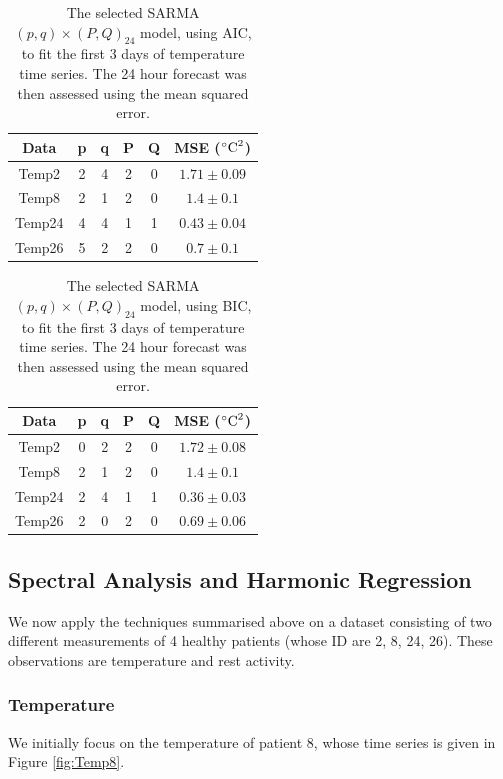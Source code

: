 \documentclass[]{article}
\begin{document}
\begin{table}[htbp]
\begin{center}
\begin{tabular}{ cccccc } 
 Data & p & q & P & Q & MSE ($^{\circ}\textup{C}^2$)\\
  \hline
 Temp2 & 2 & 4 & 2 & 0 & $1.71\pm0.09$\\
 Temp8 & 2 & 1 & 2 & 0 & $1.4\pm0.1$\\
 Temp24& 4 & 4 & 1 & 1 & $0.43\pm0.04$\\
 Temp26& 5 & 2 & 2 & 0 & $0.7\pm0.1$\\
\end{tabular}
\end{center}
\caption{The selected SARMA$(p,q)\times(P,Q)_{24}$ model, using AIC, to fit the first 3 days of temperature time series. The 24 hour forecast was then assessed using the mean squared error.}
\label{table:temp_AIC}
\end{table}

\begin{table}[htbp]
\begin{center}
\begin{tabular}{ cccccc } 
 Data & p & q & P & Q & MSE ($^{\circ}\textup{C}^2$)\\
  \hline
 Temp2 & 0 & 2 & 2 & 0 & $1.72\pm0.08$\\
 Temp8 & 2 & 1 & 2 & 0 & $1.4\pm0.1$\\
 Temp24& 2 & 4 & 1 & 1 & $0.36\pm0.03$\\
 Temp26& 2 & 0 & 2 & 0 & $0.69\pm0.06$\\
\end{tabular}
\end{center}
\caption{The selected SARMA$(p,q)\times(P,Q)_{24}$ model, using BIC, to fit the first 3 days of temperature time series. The 24 hour forecast was then assessed using the mean squared error.}
\label{table:temp_BIC}
\end{table}



\newpage
\subsection{Spectral Analysis and Harmonic Regression}
We now apply the techniques summarised above on a dataset consisting of two different measurements of 4 healthy patients (whose ID are 2, 8, 24, 26). These observations are temperature and rest activity. 

\subsubsection*{Temperature}
We initially focus on the temperature of patient 8, whose time series is given in Figure \ref{fig:Temp8}.
\end{document}
